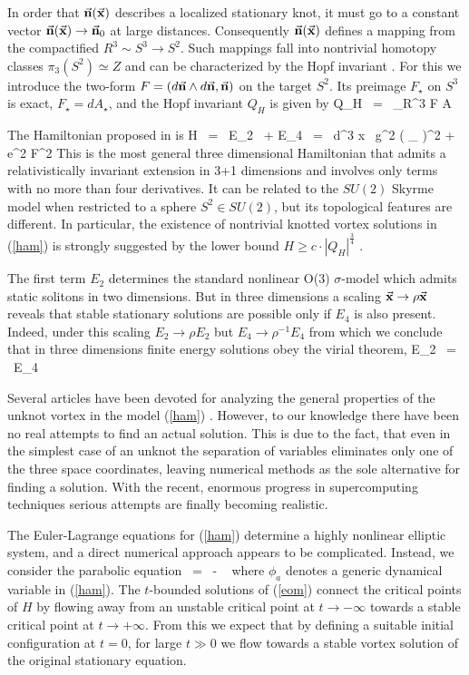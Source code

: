 In order that $\vec {\bf n}( \vec {\bf x} ) $ 
describes a localized stationary knot, it must go to
a constant vector $\vec{ \bf n}(\vec {\bf x}) \to 
\vec{\bf n}_0$ at large distances.
Consequently $\vec {\bf n}( \vec {\bf x} )$
defines a mapping from the compactified $R^3 \sim S^3 
\to S^2$. Such mappings fall into nontrivial homotopy classes
$\pi_3(S^2) \simeq Z$ and can be characterized by
the Hopf invariant \cite{ati}. For this we introduce
the two-form $ F =  ( d \vec{\bf n} \wedge 
d \vec{\bf n} , \vec{\bf n} )$ on the target $S^2$.
Its preimage $F_\star $ on $S^3$ is 
exact, $ F_\star = d A_\star$, 
and the Hopf invariant $Q_H$ is given by
\be
Q_H \ = \ \int\limits_{R^3} F \wedge A 
\ee

The Hamiltonian proposed in \cite{fadde2} is 
\be
H \ = \ E_2 \ + E_4 \ = \
\int d^3 x \ g^2 ( \partial_\mu 
{})^2 + 
e^2 F^2
\ee
This is the most general three dimensional Hamiltonian 
that admits a relativistically invariant extension in
3+1 dimensions and involves only terms with no more than four 
derivatives. It can be related to the $SU(2)$ Skyrme model when
restricted to a sphere $S^2 \in SU(2)$, but its topological 
features are different. In particular,
the existence of nontrivial knotted vortex solutions  
in (\ref{ham}) is strongly suggested by the lower bound 
$ H  \geq  c \cdot | Q_H |^{\frac{3}{4}}$ \cite{vak}.

The first term $E_2$ determines the standard 
nonlinear O(3) $\sigma$-model which admits 
static solitons in two dimensions.
But in three dimensions a scaling $ \vec{\bf x} 
\to \rho \vec{\bf x}$ reveals that stable 
stationary solutions are possible 
only if $E_4$ is also present. Indeed,
under this scaling $ E_2 \to \rho E_2$ but
$ E_4 \to \rho^{-1} E_4 $
from which we conclude that in three dimensions
finite energy solutions obey
the virial theorem,
\be
E_2 \ = \ E_4
\ee

Several articles have been devoted  
for analyzing the general properties of
the unknot vortex in the model (\ref{ham}) \cite{sany}.
However, to our knowledge there 
have been no real attempts to find an 
actual solution. This is due to the fact,
that even in the simplest case of an unknot
the separation
of variables eliminates only one of the three
space coordinates, leaving 
numerical methods as the sole alternative
for finding a solution. With
the recent, enormous progress in supercomputing
techniques serious attempts are
finally becoming realistic. 

The Euler-Lagrange equations for 
(\ref{ham}) determine a highly 
nonlinear elliptic system,
and a direct numerical approach 
appears to be complicated.
Instead, we consider the parabolic equation
\be
{} \ = \ - \ 
\ee
where $\phi_a$ denotes a generic
dynamical variable in (\ref{ham}). 
The $t$-bounded solutions of (\ref{eom}) 
connect the
critical points of $H$ by flowing away from 
an unstable critical point at $t \to -\infty$
towards a stable critical point at $t \to + \infty$.
From this we expect that by defining a suitable
initial configuration at $t=0$, for large $t \gg 0$
we flow towards a stable vortex solution of 
the original stationary equation.

